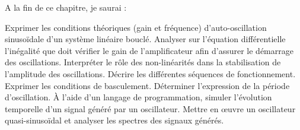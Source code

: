 A la fin de ce chapitre, je saurai :
\begin{competences}
  \point Exprimer les conditions théoriques (gain et fréquence) d’auto-oscillation sinusoïdale d’un système linéaire bouclé.
  \point Analyser sur l’équation différentielle l’inégalité que doit vérifier le gain de l’amplificateur afin d’assurer le démarrage des oscillations.
  \point Interpréter le rôle des non-linéarités dans la stabilisation de l’amplitude des oscillations.
  \point Décrire les différentes séquences de fonctionnement.
  \point Exprimer les conditions de basculement.
  \point Déterminer l’expression de la période d’oscillation.
  \point \faLaptop À l’aide d’un langage de programmation, simuler l’évolution temporelle d’un signal généré par un oscillateur.
  \point \faSignLanguage Mettre en œuvre un oscillateur quasi-sinusoïdal et analyser les spectres des signaux générés.
\end{competences}
